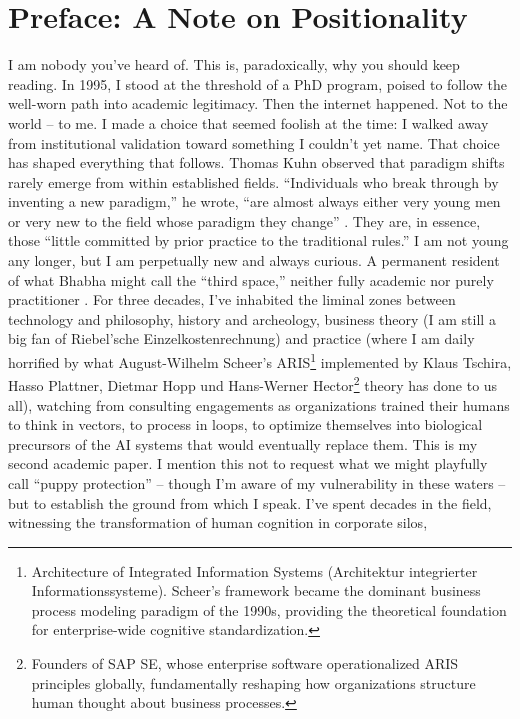 \section*{Preface: A Note on Positionality}

I am nobody you've heard of.
This is, paradoxically, why you should keep reading.
In 1995, I stood at the threshold of a PhD program, poised to follow the well-worn path into academic legitimacy.
Then the internet happened. Not to the world – to me. I made a choice that seemed foolish at the time:
I walked away from institutional validation toward something I couldn't yet name.
That choice has shaped everything that follows.
Thomas Kuhn observed that paradigm shifts rarely emerge from within established fields.
``Individuals who break through by inventing a new paradigm,'' he wrote, ``are almost always either very young men
or very new to the field whose paradigm they change'' \citep{kuhn1962}. They are, in essence, those 
``little committed by prior practice to the traditional rules.''
I am not young any longer, but I am perpetually new and always curious.
A permanent resident of what Bhabha might call the ``third space,'' neither fully academic
nor purely practitioner \citep{bhabha1994}.
For three decades, I've inhabited the liminal zones between technology and philosophy, history and archeology,
business theory (I am still a big fan of Riebel'sche Einzelkostenrechnung) and practice
(where I am daily horrified by what August-Wilhelm Scheer's ARIS\footnote{Architecture of Integrated Information Systems 
(Architektur integrierter Informationssysteme). Scheer's framework became the dominant business process modeling
paradigm of the 1990s, providing the theoretical foundation for enterprise-wide cognitive standardization.} implemented by
Klaus Tschira, Hasso Plattner, Dietmar Hopp und Hans-Werner Hector\footnote{Founders of SAP SE, whose enterprise
software operationalized ARIS principles globally, fundamentally reshaping how organizations structure
human thought about business processes.} theory has done to us all),
watching from consulting engagements as organizations trained their humans to think in vectors,
to process in loops, to optimize themselves into biological precursors of the AI systems that would eventually replace them.
This is my second academic paper. I mention this not to request what we might playfully call
``puppy protection'' – though I'm aware of my vulnerability in these waters – but to establish the ground from which I speak.
I've spent decades in the field, witnessing the transformation of human cognition in corporate silos,
